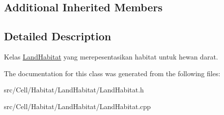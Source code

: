 \subsection*{Additional Inherited Members}


\subsection{Detailed Description}
Kelas \hyperlink{classLandHabitat}{Land\+Habitat} yang merepesentasikan habitat untuk hewan darat. 

The documentation for this class was generated from the following files\+:\begin{DoxyCompactItemize}
\item 
src/\+Cell/\+Habitat/\+Land\+Habitat/Land\+Habitat.\+h\item 
src/\+Cell/\+Habitat/\+Land\+Habitat/Land\+Habitat.\+cpp\end{DoxyCompactItemize}
